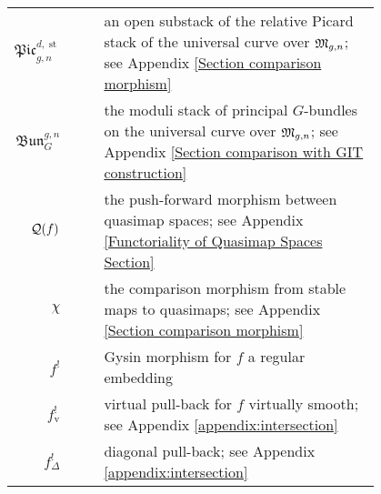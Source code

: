 \begin{longtabu}{r c c p{0.8\linewidth}}
$\mathfrak{Pic}_{g,n}^{d,\operatorname{st}}$ & & & an open substack of the relative Picard stack of the universal curve over $\mathfrak M_{g,n}$; see Appendix  \ref{Section comparison morphism} \\
$\mathfrak{Bun}_{G}^{g,n}$ & & & the moduli stack of principal $G$-bundles on the universal curve over $\mathfrak M_{g,n}$; see Appendix \ref{Section comparison with GIT construction} \\
$\mathcal{Q}(f)$ & & & the push-forward morphism between quasimap spaces; see Appendix \ref{Functoriality of Quasimap Spaces Section} \\
$\chi$ & & & the comparison morphism from stable maps to quasimaps; see Appendix \ref{Section comparison morphism} \\
$f^!$ & & & Gysin morphism for $f$ a regular embedding \\
$f^!_{\text{v}}$ & & & virtual pull-back for $f$ virtually smooth; see Appendix \ref{appendix:intersection} \\
$f^!_{\Delta}$ & & & diagonal pull-back; see Appendix \ref{appendix:intersection}
\end{longtabu}